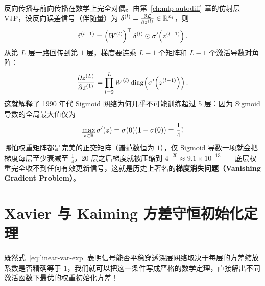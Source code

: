 反向传播与前向传播在数学上完全对偶。由第~\ref{ch:mlp-autodiff} 章的仿射层 VJP，设反向误差信号（伴随量）为 $\delta^{(l)} = \frac{\partial \mathcal{L}}{\partial z^{(l)}} \in \mathbb{R}^{n_l}$，则
\[
  \delta^{(l-1)} = \left(W^{(l)}\right)^\top \delta^{(l)} \odot \sigma'\!\left(z^{(l-1)}\right).
\]
从第 $L$ 层一路回传到第 $1$ 层，梯度要连乘 $L-1$ 个矩阵和 $L-1$ 个激活导数对角阵：
\begin{equation}
  \frac{\partial z^{(L)}}{\partial z^{(1)}} = \prod_{l=2}^{L} W^{(l)} \operatorname{diag}\!\left(\sigma'\!\left(z^{(l-1)}\right)\right).
  \label{eq:grad-chain}
\end{equation}
这就解释了 1990 年代 Sigmoid 网络为何几乎不可能训练超过 5 层：因为 Sigmoid 导数的全局最大值仅为
\[
  \max_{z \in \mathbb{R}} \sigma'(z) = \sigma(0)(1-\sigma(0)) = \frac{1}{4}!
\]
哪怕权重矩阵都是完美的正交矩阵（谱范数恒为 $1$），仅 Sigmoid 导数一项就会把梯度每层至少衰减至 $\frac{1}{4}$，20 层之后梯度就被压缩到 $4^{-20} \approx 9.1 \times 10^{-13}$——底层权重完全收不到任何有效更新信号，这就是历史上著名的\textbf{梯度消失问题（Vanishing Gradient Problem）}。

\section{Xavier 与 Kaiming 方差守恒初始化定理}
\label{sec:init-theory}

既然式~\eqref{eq:linear-var-exp} 表明信号能否平稳穿透深层网络取决于每层的方差缩放系数是否精确等于 $1$，我们就可以把这一条件写成严格的数学定理，直接解出不同激活函数下最优的权重初始化方差！

